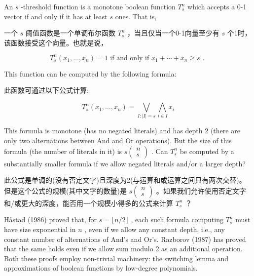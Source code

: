 \documentclass[10pt]{article}
\begin{document}
An \(s\) -threshold function is a monotone boolean function \({T}_{s}^{n}\) which accepts a 0-1 vector if and only if it has at least \(s\) ones. That is,

\begin{tcolorbox}\relax
一个 \(s\) 阈值函数是一个单调布尔函数 \({T}_{s}^{n}\) ，当且仅当一个0-1向量至少有 \(s\) 个1时，该函数接受这个向量。也就是说，
\end{tcolorbox}

\[
{T}_{s}^{n}\left( {{x}_{1},\ldots ,{x}_{n}}\right)  = 1\text{ if and only if }{x}_{1} + \cdots  + {x}_{n} \geq  s\text{ . }
\]

This function can be computed by the following formula:

\begin{tcolorbox}\relax
此函数可通过以下公式计算:
\end{tcolorbox}

\[
{T}_{s}^{n}\left( {{x}_{1},\ldots ,{x}_{n}}\right)  = \mathop{\bigvee }\limits_{{I : \left| I\right|  = s}}\mathop{\bigwedge }\limits_{{i \in  I}}{x}_{i}
\]

This formula is monotone (has no negated literals) and has depth 2 (there are only two alternations between And and Or operations). But the size of this formula (the number of literals in it) is \(s\left( \begin{array}{l} n \\  s \end{array}\right)\) . Can \({T}_{s}^{n}\) be computed by a substantially smaller formula if we allow negated literals and/or a larger depth?

\begin{tcolorbox}\relax
此公式是单调的(没有否定文字)且深度为2(与运算和或运算之间只有两次交替)。但是这个公式的规模(其中文字的数量)是 \(s\left( \begin{array}{l} n \\  s \end{array}\right)\) 。如果我们允许使用否定文字和/或更大的深度，能否用一个规模小得多的公式来计算 \({T}_{s}^{n}\) ？
\end{tcolorbox}

Håstad (1986) proved that, for \(s = \lfloor n/2\rfloor\) , each such formula computing \({T}_{s}^{n}\) must have size exponential in \(n\) , even if we allow any constant depth, i.e., any constant number of alternations of And's and Or's. Razborov (1987) has proved that the same holds even if we allow sum modulo 2 as an additional operation. Both these proofs employ non-trivial machinery: the switching lemma and approximations of boolean functions by low-degree polynomials.
\end{document}
